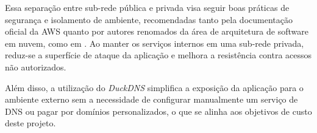 Essa separação entre sub-rede pública e privada visa seguir boas práticas de segurança e isolamento de ambiente, recomendadas tanto pela documentação oficial da AWS quanto por autores renomados da área de arquitetura de software em nuvem, como em \cite{AWSBestPractices}. Ao manter os serviços internos em uma sub-rede privada, reduz-se a superfície de ataque da aplicação e melhora a resistência contra acessos não autorizados.

Além disso, a utilização do \emph{DuckDNS} simplifica a exposição da aplicação para o ambiente externo sem a necessidade de configurar manualmente um serviço de DNS ou pagar por domínios personalizados, o que se alinha aos objetivos de custo deste projeto.